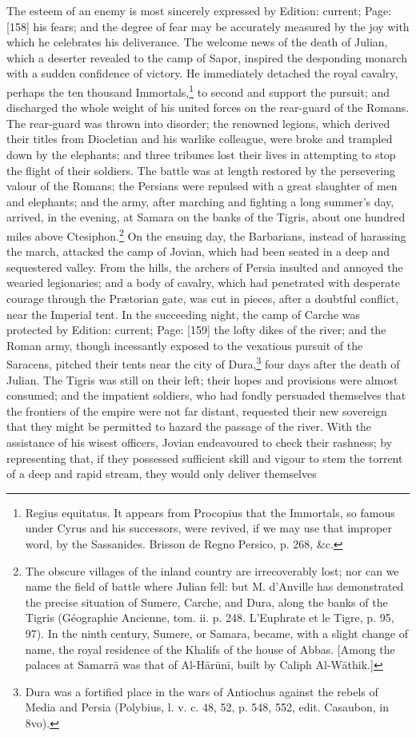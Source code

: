 The esteem of an enemy is most sincerely expressed by Edition: current; Page: [158] his fears; and the degree of fear may be accurately measured by the joy with which he celebrates his deliverance. The welcome news of the death of Julian, which a deserter revealed to the camp of Sapor, inspired the desponding monarch with a sudden confidence of victory. He immediately detached the royal cavalry, perhaps the ten thousand Immortals,\footnote{Regius equitatus. It appears from Procopius that the Immortals, so famous under Cyrus and his successors, were revived, if we may use that improper word, by the Sassanides. Brisson de Regno Persico, p. 268, \&c.} to second and support the pursuit; and discharged the whole weight of his united forces on the rear-guard of the Romans. The rear-guard was thrown into disorder; the renowned legions, which derived their titles from Diocletian and his warlike colleague, were broke and trampled down by the elephants; and three tribunes lost their lives in attempting to stop the flight of their soldiers. The battle was at length restored by the persevering valour of the Romans; the Persians were repulsed with a great slaughter of men and elephants; and the army, after marching and fighting a long summer\texthebrew{}’s day, arrived, in the evening, at Samara on the banks of the Tigris, about one hundred miles above Ctesiphon.\footnote{The obscure villages of the inland country are irrecoverably lost; nor can we name the field of battle where Julian fell: but M. d\texthebrew{}’Anville has demonstrated the precise situation of Sumere, Carche, and Dura, along the banks of the Tigris (Géographie Ancienne, tom. ii. p. 248. L\texthebrew{}’Euphrate et le Tigre, p. 95, 97). In the ninth century, Sumere, or Samara, became, with a slight change of name, the royal residence of the Khalifs of the house of Abbas. [Among the palaces at Samarrā was that of Al-Hārūnī, built by Caliph Al-Wāthik.]} On the ensuing day, the Barbarians, instead of harassing the march, attacked the camp of Jovian, which had been seated in a deep and sequestered valley. From the hills, the archers of Persia insulted and annoyed the wearied legionaries; and a body of cavalry, which had penetrated with desperate courage through the Prætorian gate, was cut in pieces, after a doubtful conflict, near the Imperial tent. In the succeeding night, the camp of Carche was protected by Edition: current; Page: [159] the lofty dikes of the river; and the Roman army, though incessantly exposed to the vexatious pursuit of the Saracens, pitched their tents near the city of Dura,\footnote{Dura was a fortified place in the wars of Antiochus against the rebels of Media and Persia (Polybius, l. v. c. 48, 52, p. 548, 552, edit. Casaubon, in 8vo).} four days after the death of Julian. The Tigris was still on their left; their hopes and provisions were almost consumed; and the impatient soldiers, who had fondly persuaded themselves that the frontiers of the empire were not far distant, requested their new sovereign that they might be permitted to hazard the passage of the river. With the assistance of his wisest officers, Jovian endeavoured to check their rashness; by representing that, if they possessed sufficient skill and vigour to stem the torrent of a deep and rapid stream, they would only deliver themselves 
